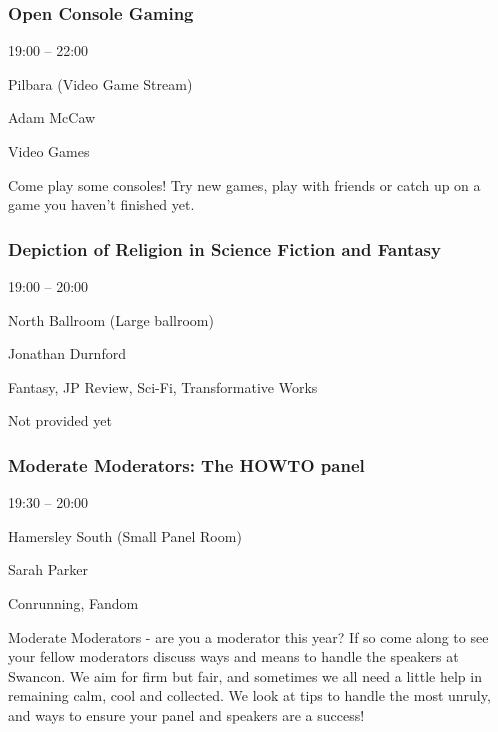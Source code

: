 \documentclass{scrreprt}
\begin{document}
\begin{multicols}{2}
\subsubsection*{Open Console Gaming}\begin{description}
\setlength{\itemsep}{0pt}
\setlength{\parsep}{0pt}
\setlength{\parskip}{0pt}
\item[Time:]{19:00 -- 22:00}
\item[Venue:]{Pilbara (Video Game Stream)}
\item[People:]{Adam McCaw}
\item[Tags:]{Video Games}\end{description}
Come play some consoles! Try new games, play with friends or catch up on a game you haven't finished yet.
\subsubsection*{Depiction of Religion in Science Fiction and Fantasy}\begin{description}
\setlength{\itemsep}{0pt}
\setlength{\parsep}{0pt}
\setlength{\parskip}{0pt}
\item[Time:]{19:00 -- 20:00}
\item[Venue:]{North Ballroom (Large ballroom)}
\item[People:]{Jonathan Durnford}
\item[Tags:]{Fantasy, JP Review, Sci-Fi, Transformative Works}\end{description}
Not provided yet
\subsubsection*{Moderate Moderators: The HOWTO panel}\begin{description}
\setlength{\itemsep}{0pt}
\setlength{\parsep}{0pt}
\setlength{\parskip}{0pt}
\item[Time:]{19:30 -- 20:00}
\item[Venue:]{Hamersley South (Small Panel Room)}
\item[People:]{Sarah Parker}
\item[Tags:]{Conrunning, Fandom}\end{description}
Moderate Moderators - are you a moderator this year? If so come along to see your fellow moderators discuss ways and means to handle the speakers at Swancon. We aim for firm but fair, and sometimes we all need a little help in remaining calm, cool and collected. We look at tips to handle the most unruly, and ways to ensure your panel and speakers are a success!

\end{multicols}
\end{document}
